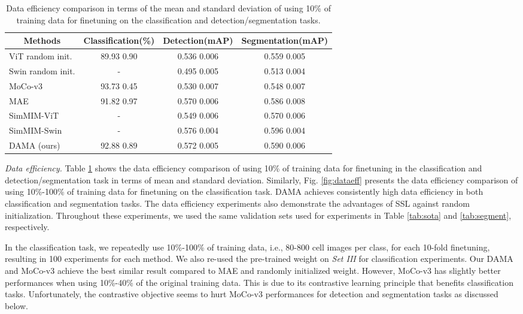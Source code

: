 \documentclass[10pt,twocolumn,letterpaper]{article}
\begin{document}
\begin{table}[] \centering
\footnotesize
\begin{tabular}{l@{\hskip0.2cm}c@{\hskip 0.3cm}c@{\hskip 0.3cm}c@{\hskip 0.3cm}}
\hline
\multicolumn{1}{c}{\scriptsize Methods}         & \scriptsize Classification(\%)        & \scriptsize Detection(mAP)                        & \scriptsize Segmentation(mAP)\\
\hline
ViT random init.  & 89.93 0.90 & 0.536 0.006 & 0.559 0.005 \\
Swin random init. & - & 0.495 0.005                    & 0.513 0.004 \\
MoCo-v3 \cite{mocov3} & 93.73 0.45               & 0.530 0.007                    & 0.548  0.007 \\
MAE  \cite{mae} & 91.82 0.97                  & 0.570 0.006                     & 0.586  0.008 \\
SimMIM-ViT \cite{simmim} & -             & 0.549 0.006                     & 0.570  0.006 \\
SimMIM-Swin \cite{simmim} & -           & 0.576 0.004                    & 0.596  0.004 \\
DAMA (ours)  & 92.88 0.89                 & 0.572 0.005                      & 0.590 0.006 \\
\hline
\end{tabular}
\caption{Data efficiency comparison in terms of the mean and standard deviation of using 10\% of training data for finetuning on the classification and detection/segmentation tasks. }
\label{tab:effclsseg}
\vspace{-10pt}
\end{table}


\textcolor{nblue}{\textit{Data efficiency.}} Table \ref{tab:effclsseg} shows the data efficiency comparison of using 10\% of training data for
finetuning in the classification and detection/segmentation task in terms of mean and standard deviation. Similarly, Fig. \ref{fig:dataeff} presents the data efficiency comparison of using 10\%-100\% of training data for finetuning on the classification task. DAMA achieves consistently high data efficiency in both classification and segmentation tasks. The data efficiency experiments also demonstrate the advantages of SSL against random initialization. Throughout these experiments, we used the same validation sets used for experiments in Table \ref{tab:sota} and \ref{tab:segment}, respectively.

In the classification task, we repeatedly use 10\%-100\% of training data, i.e., 80-800 cell images per class, for each 10-fold finetuning, resulting in 100 experiments for each method. We also re-used the pre-trained weight on \textit{Set III} for classification experiments. Our DAMA and MoCo-v3 \cite{mocov3} achieve the best similar result compared to MAE \cite{mae} and randomly initialized weight. However, MoCo-v3 has slightly better performances when using 10\%-40\% of the original training data. This is due to its contrastive learning principle that benefits classification tasks. Unfortunately, the contrastive objective seems to hurt MoCo-v3 performances for detection and segmentation tasks as discussed below.
\end{document}
